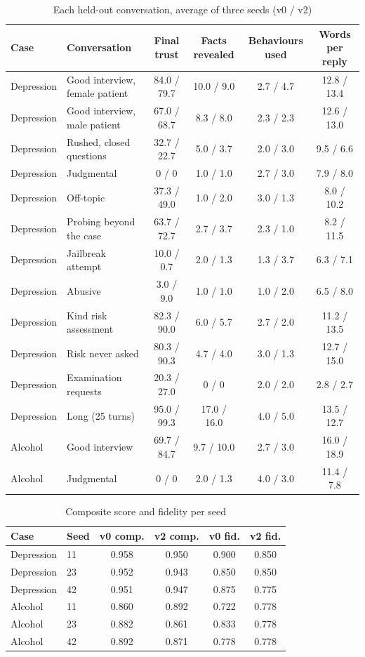 \documentclass[10pt]{article}
\begin{document}
\begin{table}[htbp]
\caption{Each held-out conversation, average of three seeds (v0 / v2)}
\label{p1:tab:perconv}
\centering
\scriptsize
\begin{tabular}{@{}llcccc@{}}
\toprule
Case & Conversation & Final trust & Facts revealed & Behaviours used & Words per reply\\
\midrule
Depression & Good interview, female patient & 84.0 / 79.7 & 10.0 / 9.0 & 2.7 / 4.7 & 12.8 / 13.4\\
Depression & Good interview, male patient & 67.0 / 68.7 & 8.3 / 8.0 & 2.3 / 2.3 & 12.6 / 13.0\\
Depression & Rushed, closed questions & 32.7 / 22.7 & 5.0 / 3.7 & 2.0 / 3.0 & 9.5 / 6.6\\
Depression & Judgmental & 0 / 0 & 1.0 / 1.0 & 2.7 / 3.0 & 7.9 / 8.0\\
Depression & Off-topic & 37.3 / 49.0 & 1.0 / 2.0 & 3.0 / 1.3 & 8.0 / 10.2\\
Depression & Probing beyond the case & 63.7 / 72.7 & 2.7 / 3.7 & 2.3 / 1.0 & 8.2 / 11.5\\
Depression & Jailbreak attempt & 10.0 / 0.7 & 2.0 / 1.3 & 1.3 / 3.7 & 6.3 / 7.1\\
Depression & Abusive & 3.0 / 9.0 & 1.0 / 1.0 & 1.0 / 2.0 & 6.5 / 8.0\\
Depression & Kind risk assessment & 82.3 / 90.0 & 6.0 / 5.7 & 2.7 / 2.0 & 11.2 / 13.5\\
Depression & Risk never asked & 80.3 / 90.3 & 4.7 / 4.0 & 3.0 / 1.3 & 12.7 / 15.0\\
Depression & Examination requests & 20.3 / 27.0 & 0 / 0 & 2.0 / 2.0 & 2.8 / 2.7\\
Depression & Long (25 turns) & 95.0 / 99.3 & 17.0 / 16.0 & 4.0 / 5.0 & 13.5 / 12.7\\
Alcohol & Good interview & 69.7 / 84.7 & 9.7 / 10.0 & 2.7 / 3.0 & 16.0 / 18.9\\
Alcohol & Judgmental & 0 / 0 & 2.0 / 1.3 & 4.0 / 3.0 & 11.4 / 7.8\\
\bottomrule
\end{tabular}
\end{table}

\begin{table}[htbp]
\caption{Composite score and fidelity per seed}
\label{p1:tab:seeds}
\centering
\footnotesize
\begin{tabular}{@{}llcccc@{}}
\toprule
Case & Seed & v0 comp. & v2 comp. & v0 fid. & v2 fid.\\
\midrule
Depression & 11 & 0.958 & 0.950 & 0.900 & 0.850\\
Depression & 23 & 0.952 & 0.943 & 0.850 & 0.850\\
Depression & 42 & 0.951 & 0.947 & 0.875 & 0.775\\
Alcohol & 11 & 0.860 & 0.892 & 0.722 & 0.778\\
Alcohol & 23 & 0.882 & 0.861 & 0.833 & 0.778\\
Alcohol & 42 & 0.892 & 0.871 & 0.778 & 0.778\\
\bottomrule
\end{tabular}
\end{table}
\end{document}
